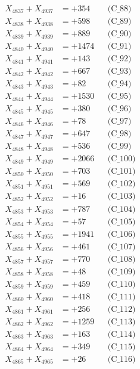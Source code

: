 \documentclass[a4paper,10pt]{article}
\begin{document}
{\begin{align}
X_{4837} + X_{4937} &= +354 && \text{(C\_88)} \\
X_{4838} + X_{4938} &= +598 && \text{(C\_89)} \\
X_{4839} + X_{4939} &= +889 && \text{(C\_90)} \\
\allowbreak
X_{4840} + X_{4940} &= +1474 && \text{(C\_91)} \\
X_{4841} + X_{4941} &= +143 && \text{(C\_92)} \\
X_{4842} + X_{4942} &= +667 && \text{(C\_93)} \\
X_{4843} + X_{4943} &= +82 && \text{(C\_94)} \\
X_{4844} + X_{4944} &= +1530 && \text{(C\_95)} \\
\allowbreak
X_{4845} + X_{4945} &= +380 && \text{(C\_96)} \\
X_{4846} + X_{4946} &= +78 && \text{(C\_97)} \\
X_{4847} + X_{4947} &= +647 && \text{(C\_98)} \\
X_{4848} + X_{4948} &= +536 && \text{(C\_99)} \\
X_{4849} + X_{4949} &= +2066 && \text{(C\_100)} \\
\allowbreak
X_{4850} + X_{4950} &= +703 && \text{(C\_101)} \\
X_{4851} + X_{4951} &= +569 && \text{(C\_102)} \\
X_{4852} + X_{4952} &= +16 && \text{(C\_103)} \\
X_{4853} + X_{4953} &= +787 && \text{(C\_104)} \\
X_{4854} + X_{4954} &= +57 && \text{(C\_105)} \\
\allowbreak
X_{4855} + X_{4955} &= +1941 && \text{(C\_106)} \\
X_{4856} + X_{4956} &= +461 && \text{(C\_107)} \\
X_{4857} + X_{4957} &= +770 && \text{(C\_108)} \\
X_{4858} + X_{4958} &= +48 && \text{(C\_109)} \\
X_{4859} + X_{4959} &= +459 && \text{(C\_110)} \\
\allowbreak
X_{4860} + X_{4960} &= +418 && \text{(C\_111)} \\
X_{4861} + X_{4961} &= +256 && \text{(C\_112)} \\
X_{4862} + X_{4962} &= +1259 && \text{(C\_113)} \\
X_{4863} + X_{4963} &= +163 && \text{(C\_114)} \\
X_{4864} + X_{4964} &= +349 && \text{(C\_115)} \\
\allowbreak
X_{4865} + X_{4965} &= +26 && \text{(C\_116)} \\

\end{align}}
\end{document}
